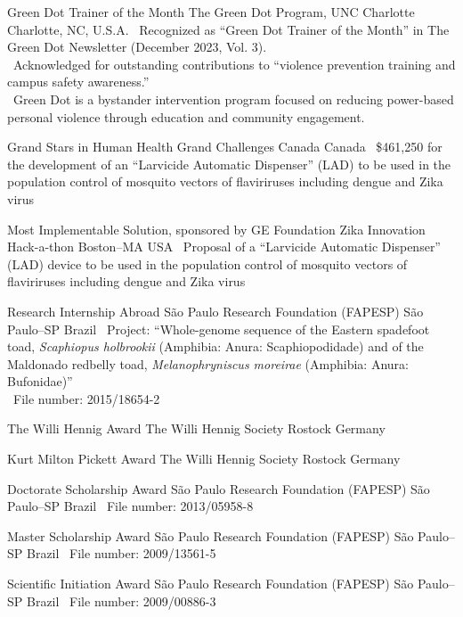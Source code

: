\documentclass[11pt, letterpaper, sans]{moderncv}
\begin{document}
    {Green Dot Trainer of the Month}
    {The Green Dot Program, UNC Charlotte}
    {Charlotte, NC, U.S.A.}
    {}
    {
        \textbullet~Recognized as ``Green Dot Trainer of the Month'' in The Green Dot Newsletter (December 2023, Vol. 3).\\
        \textbullet~Acknowledged for outstanding contributions to ``violence prevention training and campus safety awareness.''\\
        \textbullet~Green Dot is a bystander intervention program focused on reducing power-based personal violence through education and community engagement.\\
    }


	{Grand Stars in Human Health}
	{Grand Challenges Canada}
	{Canada}
	{}
	{\textbullet~\$461,250 for the development of an ``Larvicide Automatic Dispenser'' (LAD) to be used in the population control of mosquito vectors of flaviriruses including dengue and Zika virus}

\cventry{---}
	{Most Implementable Solution, sponsored by GE Foundation}
	{Zika Innovation Hack-a-thon}
	{Boston--MA}
	{USA}
	{\textbullet~Proposal of a ``Larvicide Automatic Dispenser'' (LAD) device to be used in the population control of mosquito vectors of flaviriruses including dengue and Zika virus}

	{Research Internship Abroad}
	{São Paulo Research Foundation (FAPESP)}
	{São Paulo--SP}
	{Brazil}
	{
		\textbullet~Project: ``Whole-genome sequence of the Eastern spadefoot toad, \textit{Scaphiopus holbrookii} (Amphibia: Anura: Scaphiopodidade) and of the Maldonado redbelly toad, \textit{Melanophryniscus moreirae} (Amphibia: Anura: Bufonidae)''\\
		\textbullet~File number: 2015/18654-2
	}

	{The Willi Hennig Award}
	{The Willi Hennig Society}
	{Rostock}
	{Germany}
	{}

\cventry{---}
	{Kurt Milton Pickett Award}
	{The Willi Hennig Society}
	{Rostock}
	{Germany}
	{}

	{Doctorate Scholarship Award}
	{São Paulo Research Foundation (FAPESP)}
	{São Paulo--SP}
	{Brazil}
	{
		\textbullet~File number: 2013/05958-8
	}

	{Master Scholarship Award}
	{São Paulo Research Foundation (FAPESP)}
	{São Paulo--SP}
	{Brazil}
	{
		\textbullet~File number: 2009/13561-5
	}

	{Scientific Initiation Award}
	{São Paulo Research Foundation (FAPESP)}
	{São Paulo--SP}
	{Brazil}
	{
		\textbullet~File number: 2009/00886-3
	}
\end{document}
